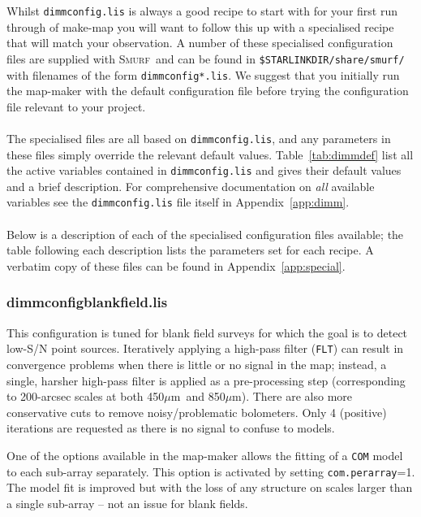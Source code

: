 \documentclass[twoside,11pt]{article}
\newcommand{\xref}[3]{#1}
\renewcommand{\_}{\texttt{\symbol{95}}}
\newcommand{\micron}{\mbox{$\mu$m}}
\newcommand{\smurf}{\xref{\textsc{Smurf}}{sun258}{}}
\begin{document}
Whilst \texttt{dimmconfig.lis} is always a good recipe to start with
for your first run through of make-map you will want to follow this up
with a specialised recipe that will match your observation. A number
of these specialised configuration files are supplied with \smurf\ and
can be found in \texttt{\$STARLINK\_DIR/share/smurf/} with filenames
of the form \texttt{dimmconfig*.lis}. We suggest that you initially
run the map-maker with the default configuration file before trying
the configuration file relevant to your project.
\\ \\
The specialised files are all based on \texttt{dimmconfig.lis}, and
any parameters in these files simply override the relevant default
values.  Table~\ref{tab:dimmdef} list all the active variables
contained in \texttt{dimmconfig.lis} and gives their default values
and a brief description. For comprehensive documentation on \emph{all}
available variables see the \texttt{dimmconfig.lis} file itself in
Appendix~\ref{app:dimm}.
\\ \\
Below is a description of each of the specialised configuration files
available; the table following each description lists the parameters
set for each recipe. A verbatim copy of these files can be found in
Appendix~\ref{app:special}.

\subsubsection{dimmconfig\_blank\_field.lis}

This configuration is tuned for blank field surveys for which the goal
is to detect low-S/N point sources. Iteratively applying a high-pass
filter (\texttt{FLT}) can result in convergence problems when there is
little or no signal in the map; instead, a single, harsher high-pass
filter is applied as a pre-processing step (corresponding to
200-arcsec scales at both 450\micron\ and 850\micron). There are also
more conservative cuts to remove noisy/problematic bolometers. Only 4
(positive) iterations are requested as there is no signal to confuse
to models.

One of the options available in the map-maker allows the fitting of a
\texttt{COM} model to each sub-array separately. This option is
activated by setting \texttt{com.perarray}=1. The model fit is
improved but with the loss of any structure on scales larger than a
single sub-array -- not an issue for blank fields.
\end{document}
